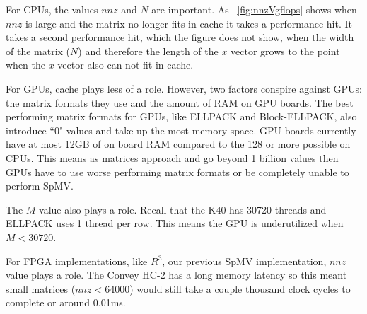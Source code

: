 For CPUs, the values $nnz$ and $N$ are important. As \figurename~\ref{fig:nnzVgflops} shows when  $nnz$ is large and the matrix no longer fits in cache it takes a performance hit. It takes a second performance hit, which the figure does not show,  when the width of the matrix ($N$) and therefore the length of the $x$ vector grows to the point when the $x$ vector also can not fit in cache. \par
For GPUs, cache plays less of a role. However, two factors conspire against GPUs: the matrix formats they use and the amount of RAM on GPU boards. The best performing matrix formats for GPUs, like ELLPACK and Block-ELLPACK, also introduce ``0" values and take up the most memory space. GPU boards currently have at most 12GB of on board RAM compared to the 128 or more possible on CPUs. This means as matrices approach and go beyond 1 billion values then GPUs have to use worse performing matrix formats or be completely unable to perform SpMV. \par
The $M$ value also plays a role. Recall that the K40 has 30720 threads and ELLPACK uses 1 thread per row. This means the GPU is underutilized when $M<30720$.\par
For FPGA implementations, like $R^3$, our previous SpMV implementation, $nnz$ value plays a role. The Convey HC-2 has a long memory latency so this meant small matrices ($nnz<64000$) would still take a couple thousand clock cycles to complete or around 0.01ms.\par


